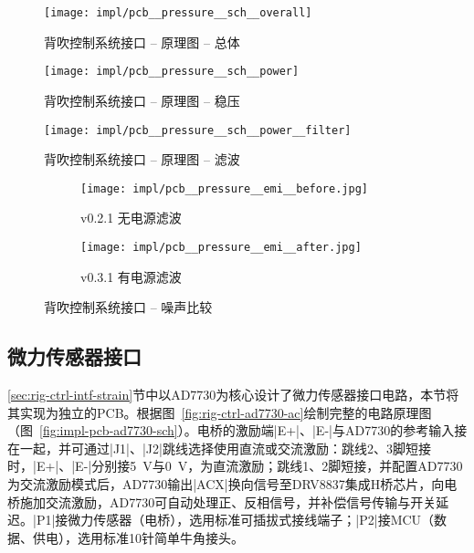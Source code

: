 \begin{figure}[hbp]
\centering
\texttt{[image: impl/pcb\_\_pressure\_\_sch\_\_overall]}
\caption{背吹控制系统接口 -- 原理图 -- 总体}
\label{fig:impl-pcb-pressure-sch-overall}
\end{figure}

\begin{figure}[hbp]
\centering
\texttt{[image: impl/pcb\_\_pressure\_\_sch\_\_power]}
\caption{背吹控制系统接口 -- 原理图 -- 稳压}
\label{fig:impl-pcb-pressure-sch-power}
\end{figure}

\begin{figure}[p]
\centering
\texttt{[image: impl/pcb\_\_pressure\_\_sch\_\_power\_\_filter]}
\caption{背吹控制系统接口 -- 原理图 -- 滤波}
\label{fig:impl-pcb-pressure-sch-power-filter}
\end{figure}

\begin{figure}[p]
  \centering
  \begin{subfigure}{1\textwidth}
    \centering
    \texttt{[image: impl/pcb\_\_pressure\_\_emi\_\_before.jpg]}
    \caption{v0.2.1 无电源滤波}
    \label{fig:impl-pcb-pressure-emi-before}
  \end{subfigure}
  \par\bigskip
  \begin{subfigure}{1\textwidth}
    \centering
    \texttt{[image: impl/pcb\_\_pressure\_\_emi\_\_after.jpg]}
    \caption{v0.3.1 有电源滤波}
    \label{fig:impl-pcb-pressure-emi-after}
  \end{subfigure}
\caption{背吹控制系统接口 -- 噪声比较}
\label{fig:impl-pcb-pressure-emi}
\end{figure}



\clearpage


\subsection{微力传感器接口}\label{sec:impl-pcb-ad7730}

\ref{sec:rig-ctrl-intf-strain}节中以AD7730为核心设计了微力传感器接口电路，本节将其实现为独立的PCB。根据图~\ref{fig:rig-ctrl-ad7730-ac}绘制完整的电路原理图（图~\ref{fig:impl-pcb-ad7730-sch}）。电桥的激励端\bverb|E+|、\bverb|E-|与AD7730的参考输入接在一起，并可通过\bverb|J1|、\bverb|J2|跳线选择使用直流或交流激励：跳线2、3脚短接时，\bverb|E+|、\bverb|E-|分别接\SI{+5}{\V}与\SI{0}{\V}，为直流激励；跳线1、2脚短接，并配置AD7730为交流激励模式后，AD7730输出\bverb|ACX|换向信号至DRV8837集成H桥芯片，向电桥施加交流激励，AD7730可自动处理正、反相信号，并补偿信号传输与开关延迟。\bverb|P1|接微力传感器（电桥），选用标准可插拔式接线端子；\bverb|P2|接MCU（数据、供电），选用标准10针简单牛角接头。

